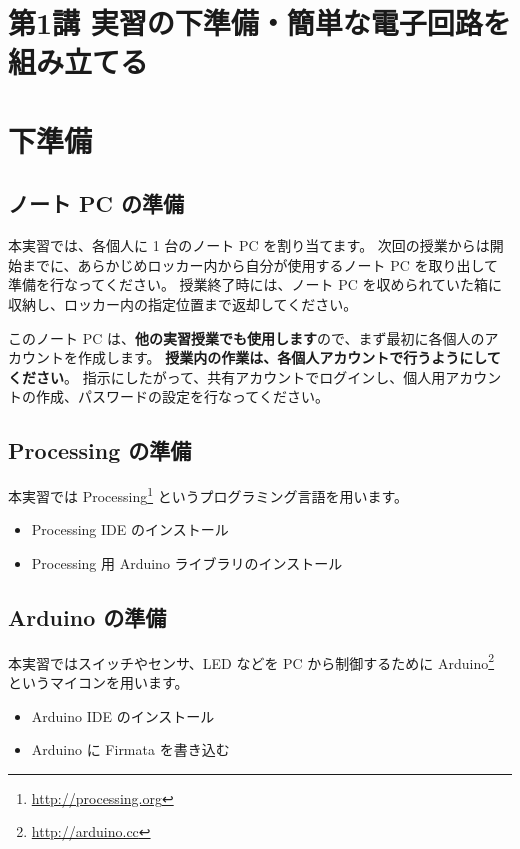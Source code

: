 \documentclass[11pt,a4paper]{jarticle}
\begin{document}
\section*{\LARGE{第1講 実習の下準備・簡単な電子回路を組み立てる}}



\section{下準備}
\subsection*{ノート PC の準備}
本実習では、各個人に 1 台のノート PC を割り当てます。
次回の授業からは開始までに、あらかじめロッカー内から自分が使用するノート PC を取り出して準備を行なってください。
授業終了時には、ノート PC を収められていた箱に収納し、ロッカー内の指定位置まで返却してください。

このノート PC は、\textbf{他の実習授業でも使用します}ので、まず最初に各個人のアカウントを作成します。
\textbf{授業内の作業は、各個人アカウントで行うようにしてください}。
指示にしたがって、共有アカウントでログインし、個人用アカウントの作成、パスワードの設定を行なってください。

\subsection*{Processing の準備}
本実習では Processing\footnote{\url{http://processing.org}} というプログラミング言語を用います。

\begin{itemize}
 \item Processing IDE のインストール
 \item Processing 用 Arduino ライブラリのインストール
\end{itemize}

\subsection*{Arduino の準備}
本実習ではスイッチやセンサ、LED などを PC から制御するために Arduino\footnote{\url{http://arduino.cc}} というマイコンを用います。

\begin{itemize}
 \item Arduino IDE のインストール
 \item Arduino に Firmata を書き込む
\end{itemize}
\end{document}
